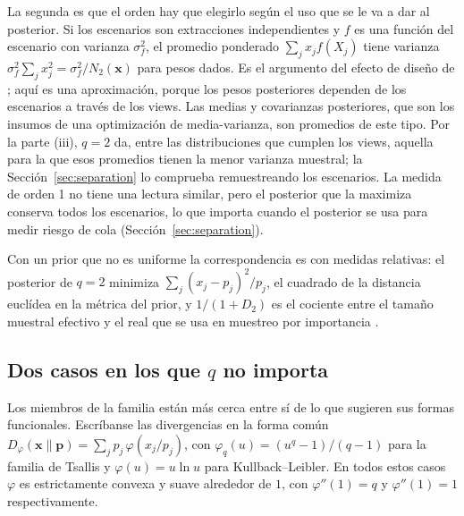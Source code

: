 \documentclass[11pt]{article}
\newcommand{\p}{\mathbf{p}}
\newcommand{\x}{\mathbf{x}}
\begin{document}
La segunda es que el orden hay que elegirlo seg\'un el uso que se le va a
dar al posterior. Si los escenarios son extracciones independientes y $f$
es una funci\'on del escenario con varianza $\sigma_f^2$, el promedio
ponderado $\sum_j x_j f(X_j)$ tiene varianza
$\sigma_f^2 \sum_j x_j^2 = \sigma_f^2 / N_2(\x)$ para pesos dados. Es el
argumento del efecto de dise\~no de \citet{Kish1965}; aqu\'i es una
aproximaci\'on, porque los pesos posteriores dependen de los escenarios a
trav\'es de los views. Las medias y covarianzas posteriores, que son los
insumos de una optimizaci\'on de media-varianza, son promedios de este tipo.
Por la parte (iii), $q=2$ da, entre las distribuciones que cumplen los
views, aquella para la que esos promedios tienen la menor varianza
muestral; la
Secci\'on~\ref{sec:separation} lo comprueba remuestreando los escenarios. La
medida de orden 1 no tiene una lectura similar, pero el posterior que la
maximiza conserva todos los escenarios, lo que importa cuando el posterior
se usa para medir riesgo de cola (Secci\'on~\ref{sec:separation}).

Con un prior que no es uniforme la correspondencia es con medidas
relativas: el posterior de $q=2$ minimiza
$\sum_j (x_j - p_j)^2/p_j$, el cuadrado de la distancia eucl\'idea en la
m\'etrica del prior, y $1/(1+D_2)$ es el cociente entre el tama\~no muestral
efectivo y el real que se usa en muestreo por importancia
\citep{KongLiuWong1994}.

\subsection{Dos casos en los que \texorpdfstring{$q$}{q} no importa}

Los miembros de la familia est\'an m\'as cerca entre s\'i de lo que sugieren sus
formas funcionales. Escr\'ibanse las divergencias en la forma com\'un
$D_\varphi(\x\|\p) = \sum_j p_j\, \varphi(x_j/p_j)$, con
$\varphi_q(u) = (u^q-1)/(q-1)$ para la familia de Tsallis y
$\varphi(u) = u \ln u$ para Kullback--Leibler. En todos estos casos
$\varphi$ es estrictamente convexa y suave alrededor de $1$, con
$\varphi''(1) = q$ y $\varphi''(1)=1$ respectivamente.
\end{document}
